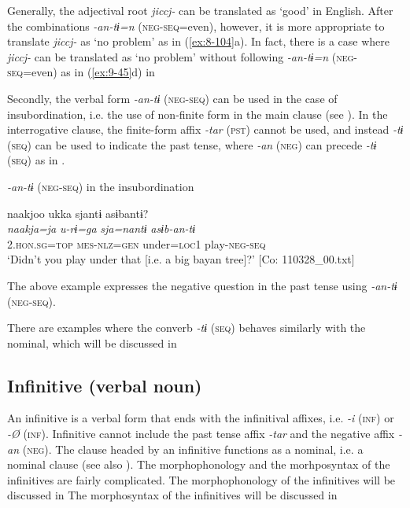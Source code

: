 Generally, the adjectival root \textit{jiccj-} can be translated as ‘good’ in English. After the combinations \textit{-an-tɨ=n} (\textsc{neg}-\textsc{seq}=even), however, it is more appropriate to translate \textit{jiccj-} as ‘no problem’ as in (\ref{ex:8-104}a). In fact, there is a case where \textit{jiccj-} can be translated as ‘no problem’ without following \textit{-an-tɨ=n} (\textsc{neg}-\textsc{seq}=even) as in (\ref{ex:9-45}d) in 

  Secondly, the verbal form \textit{-an-tɨ} (\textsc{neg}-\textsc{seq}) can be used in the case of insubordination, i.e. the use of non-finite form in the main clause (see ). In the interrogative clause, the finite-form affix \textit{-tar} (\textsc{pst}) cannot be used, and instead \textit{-tɨ} (\textsc{seq}) can be used to indicate the past tense, where \textit{-an} (\textsc{neg}) can precede \textit{-tɨ} (\textsc{seq}) as in .

\ea\label{ex:8-105}
  \textit{-an-tɨ} (\textsc{neg}-\textsc{seq}) in the insubordination

  {\TM}
\glll  naakjoo  ukka  sjantɨ  asɨbantɨ?\\
\textit{naakja=ja}  \textit{u-rɨ=ga}  \textit{sja=nantɨ}  \textit{asɨb-an-tɨ}\\
    2.\textsc{hon}.\textsc{sg}=\textsc{top}  \textsc{mes}-\textsc{nlz}=\textsc{gen}  under=\textsc{loc1}  play-\textsc{neg}-\textsc{seq}\\
\glt ‘Didn’t you play under that [i.e. a big bayan tree]?’ [Co: 110328\_00.txt]
\z

The above example expresses the negative question in the past tense using \textit{-an-tɨ} (\textsc{neg}-\textsc{seq}).

  There are examples where the converb \textit{-tɨ} (\textsc{seq}) behaves similarly with the nominal, which will be discussed in 

\subsection{Infinitive (verbal noun)}

An infinitive is a verbal form that ends with the infinitival affixes, i.e. \textit{-i} (\textsc{inf}) or \textit{-Ø} (\textsc{inf}). Infinitive cannot include the past tense affix \textit{-tar} and the negative affix \textit{-an} (\textsc{neg}). The clause headed by an infinitive functions as a nominal, i.e. a nominal clause (see also ). The morphophonology and the morhposyntax of the infinitives are fairly complicated. The morphophonology of the infinitives will be discussed in  The morphosyntax of the infinitives will be discussed in 

